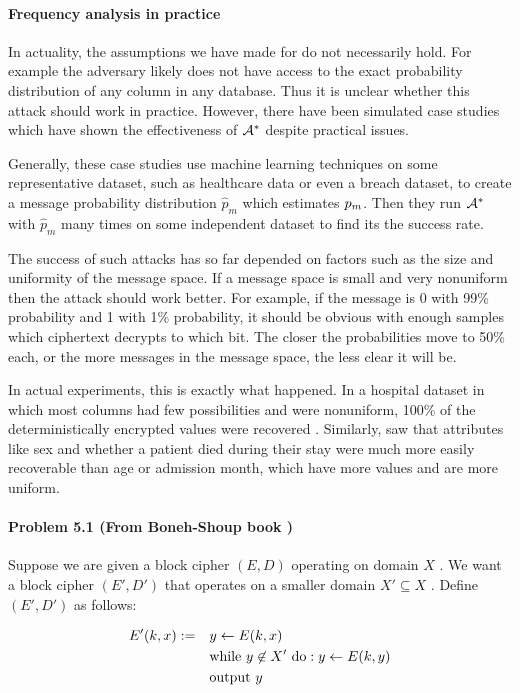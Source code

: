\paragraph{Frequency analysis in practice}
In actuality, the assumptions we have made for  do not necessarily hold. For example the adversary likely does not have access to the exact probability distribution of any column in any database. Thus it is unclear whether this attack should work in practice. However, there have been simulated case studies which have shown the effectiveness of ${\mathcal A}^*$ despite practical issues.

Generally, these case studies use machine learning techniques on some representative dataset, such as healthcare data or even a breach dataset, to create a message probability distribution $\hat p_m$ which estimates $p_m$. Then they run ${\mathcal A}^*$ with $\hat p_m$ many times on some independent dataset to find its the success rate.

The success of such attacks has so far depended on factors such as the size and uniformity of the message space. If a message space is small and very nonuniform then the attack should work better. For example, if the message is 0 with 99\% probability and 1 with 1\% probability, it should be obvious with enough samples which ciphertext decrypts to which bit. The closer the probabilities move to 50\% each, or the more messages in the message space, the less clear it will be.

In actual experiments, this is exactly what happened. In a hospital dataset in which most columns had few possibilities and were nonuniform, 100\% of the deterministically encrypted values were recovered \cite{Bindschaelder2018tao}. Similarly, \cite{Naveed2015inference} saw that attributes like sex and whether a patient died during their stay were much more easily recoverable than age or admission month, which have more values and are more uniform.

\paragraph{Problem 5.1 (From Boneh-Shoup book \cite{BonehShoupBook})} Suppose we are given a block cipher $(E,D)$ operating
on domain $X$ . We want a block cipher $(E', D')$ that operates on a smaller domain $X'\subseteq X$ . Define $(E', D')$ as follows:

\begin{align*}
   E'(k, x) := \hspace*{1em} &y \leftarrow E(k, x)\\
    &\textrm{while } y \not\in X' \textrm{ do}: y \leftarrow E(k, y)\\
    &\textrm{output }  y 
\end{align*}

